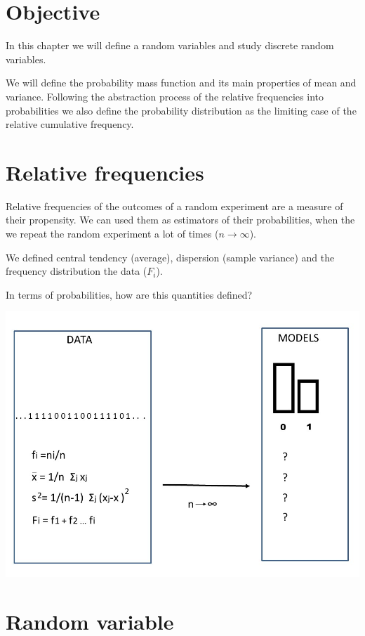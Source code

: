 \documentclass[
]{book}
\begin{document}
\hypertarget{objective}{%
\section{Objective}\label{objective}}

In this chapter we will define a random variables and study discrete random variables.

We will define the probability mass function and its main properties of mean and variance. Following the abstraction process of the relative frequencies into probabilities we also define the probability distribution as the limiting case of the relative cumulative frequency.

\hypertarget{relative-frequencies-2}{%
\section{Relative frequencies}\label{relative-frequencies-2}}

Relative frequencies of the outcomes of a random experiment are a measure of their propensity. We can used them as estimators of their probabilities, when the we repeat the random experiment a lot of times (\(n \rightarrow \infty\)).

We defined central tendency (average), dispersion (sample variance) and the frequency distribution the data (\(F_i\)).

In terms of probabilities, how are this quantities defined?

\includegraphics{./figures/randomvar.JPG}

\hypertarget{random-variable}{%
\section{Random variable}\label{random-variable}}
\end{document}
